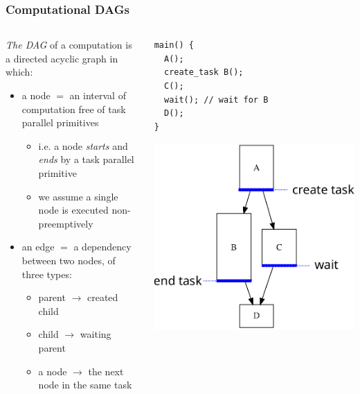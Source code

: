 \documentclass[12pt,dvipdfmx]{beamer}
\newcommand{\ao}[1]{{\color{blue}#1}}
\begin{document}
\begin{frame}[fragile]
\frametitle{Computational DAGs}
\begin{columns}[t]
\begin{column}{0.65\textwidth}
\ao{\em The DAG} of a computation is a directed acyclic graph in which:
\begin{itemize}
\item a node $=$ an interval of computation 
free of task parallel primitives
\begin{itemize}
\item i.e. a node {\em starts} and {\em ends} 
  by a task parallel primitive
\item we assume a single node is executed non-preemptively
\end{itemize}

\item an edge $=$ a dependency between two nodes, of three types:
  \begin{itemize}
  \item parent $\rightarrow$ created child
  \item child $\rightarrow$ waiting parent
  \item a node $\rightarrow$ the next node in the same task
  \end{itemize}
\end{itemize}
\end{column}

\begin{column}{0.30\textwidth}
\begin{lstlisting}
main() {
  A();
  create_task B();
  C();
  wait(); // wait for B
  D();
}    
\end{lstlisting}

\begin{center}
\includegraphics[width=\textwidth]{out/pdf/svg/dag.pdf}
\end{center}
\end{column}
\end{columns}
\end{frame}
\end{document}
